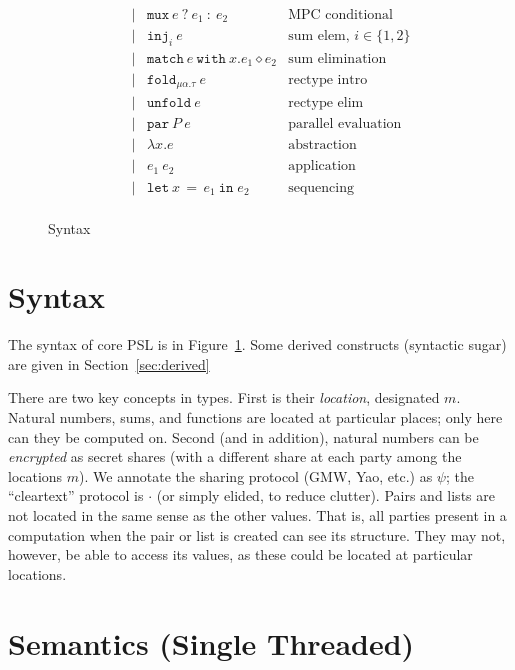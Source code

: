 \documentclass[10pt]{article}
\newcommand{\kw}[1]{\ensuremath{\mathtt{#1}}}
\newcommand{\trec}[2]{\ensuremath{\mu {#1}.{#2}}}
\newcommand{\elet}[3]{\ensuremath{\kw{let}~#1\, =\, #2~\kw{in}\;{#3}}}
\newcommand{\epar}[2]{\ensuremath{\kw{par}~{#1}~{#2}}}
\newcommand{\econd}[3]{\ensuremath{\kw{match}~{#1}~\kw{with}~x.{#2} \diamond {#3}}}
\newcommand{\emux}[3]{\ensuremath{\kw{mux}~{#1}~\kw{?}~{#2}~\kw{:}~{#3}}}
\newcommand{\einj}[2]{\ensuremath{\kw{inj}_{#1}~{#2}}}
\newcommand{\elam}[2]{\ensuremath{\lambda {#1}.{#2}}}
\newcommand{\eapp}[2]{\ensuremath{{#1}~{#2}}}
\newcommand{\efold}[2]{\ensuremath{\kw{fold}_{#1}~{#2}}}
\newcommand{\eunfold}[1]{\ensuremath{\kw{unfold}~{#1}}}
\begin{document}
\begin{figure}[h]
\[\begin{array}{rlcll}
                       && \mid & \emux{e}{e_1}{e_2}  & \text{MPC conditional} \\
                       && \mid & \einj{i}{e} & \text{sum elem, }i \in \{1,2\}\\
                       && \mid & \econd{e}{e_1}{e_2}  & \text{sum elimination} \\
                       && \mid & \efold{\trec{\alpha}{\tau}}{e} & \text{rectype intro}\\
                       && \mid & \eunfold{e} & \text{rectype elim}\\
                       && \mid & \epar{P}{e} & \text{parallel evaluation}\\
                       && \mid & \elam{x}{e}  & \text{abstraction} \\
                       && \mid & \eapp{e_1}{e_2}  & \text{application} \\
                       && \mid & \elet{x}{e_1}{e_2}  & \text{sequencing} \\
  \end{array}
  \]
  \caption{Syntax}
  \label{fig:syntax}
\end{figure}

\newpage

\section{Syntax}
  
The syntax of core PSL is in Figure~\ref{fig:syntax}. Some derived
constructs (syntactic sugar) are given in Section~\ref{sec:derived}

There are two key concepts in types. First is their \emph{location},
designated $m$. Natural numbers, sums, and functions are located at
particular places; only here can they be computed on. Second (and in
addition), natural numbers can be \emph{encrypted} as secret
shares (with a different share at each party among the locations
$m$). We annotate the sharing protocol (GMW, Yao, etc.) as $\psi$; the
``cleartext'' protocol is $\cdot$ (or simply elided, to reduce
clutter). Pairs and lists are not located in the same sense as the
other values. That is, all parties present in a computation when the
pair or list is created can see its structure. They may not, however,
be able to access its values, as these could be located at particular
locations.

\section{Semantics (Single Threaded)}
\end{document}
